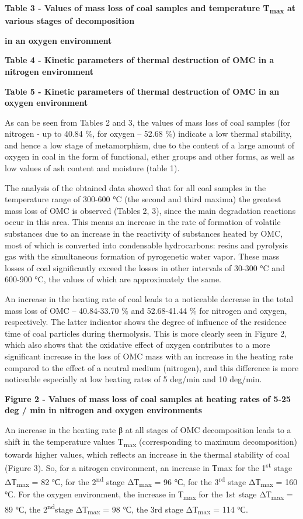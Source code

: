 {\bfseries Table 3 - Values of mass loss of coal samples and temperature
T\textsubscript{max} at various stages of decomposition}

{\bfseries in an oxygen environment}


{\bfseries Table 4 - Kinetic parameters of thermal destruction of OMC in a
nitrogen environment}


{\bfseries Table 5 - Kinetic parameters of thermal destruction of OMC in an
oxygen environment}


As can be seen from Tables 2 and 3, the values of mass loss of coal
samples (for nitrogen - up to 40.84 \%, for oxygen -- 52.68 \%) indicate
a low thermal stability, and hence a low stage of metamorphism, due to
the content of a large amount of oxygen in coal in the form of
functional, ether groups and other forms, as well as low values of ash
content and moisture (table 1).

The analysis of the obtained data showed that for all coal samples in
the temperature range of 300-600 °C (the second and third maxima) the
greatest mass loss of OMC is observed (Tables 2, 3), since the main
degradation reactions occur in this area. This means an increase in the
rate of formation of volatile substances due to an increase in the
reactivity of substances heated by OMC, most of which is converted into
condensable hydrocarbons: resins and pyrolysis gas with the simultaneous
formation of pyrogenetic water vapor. These mass losses of coal
significantly exceed the losses in other intervals of 30-300 °C and
600-900 °C, the values of which are approximately the same.

An increase in the heating rate of coal leads to a noticeable decrease
in the total mass loss of OMC -- 40.84-33.70 \% and 52.68-41.44 \% for
nitrogen and oxygen, respectively. The latter indicator shows the degree
of influence of the residence time of coal particles during thermolysis.
This is more clearly seen in Figure 2, which also shows that the
oxidative effect of oxygen contributes to a more significant increase in
the loss of OMC mass with an increase in the heating rate compared to
the effect of a neutral medium (nitrogen), and this difference is more
noticeable especially at low heating rates of 5 deg/min and 10 deg/min.

{\bfseries Figure 2 - Values of mass loss of coal samples at heating rates
of 5-25 deg / min in nitrogen and oxygen environments}

An increase in the heating rate β at all stages of OMC decomposition
leads to a shift in the temperature values T\textsubscript{max}
(corresponding to maximum decomposition) towards higher values, which
reflects an increase in the thermal stability of coal (Figure 3). So,
for a nitrogen environment, an increase in Тmax for the
1\textsuperscript{st} stage ΔТ\textsubscript{max} = 82 °С, for the
2\textsuperscript{nd} stage ΔТ\textsubscript{max} = 96 °С, for the
3\textsuperscript{rd} stage ΔТ\textsubscript{max} = 160 °С. For the
oxygen environment, the increase in Т\textsubscript{max} for the 1st
stage ΔТ\textsubscript{max} = 89 °С, the 2\textsuperscript{nd}stage
ΔТ\textsubscript{max} = 98 °С, the 3rd stage ΔТ\textsubscript{max} = 114
°С.

